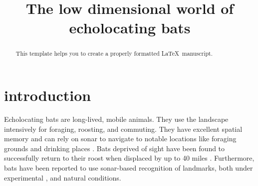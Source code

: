 \documentclass[preprint,5p]{elsarticle}
\begin{document}
\begin{frontmatter}

\title{The low dimensional world of echolocating bats}






\begin{abstract}
This template helps you to create a properly formatted \LaTeX\ manuscript.
\end{abstract}


\end{frontmatter}


\section{introduction}

Echolocating bats are long-lived, mobile animals. They use the landscape intensively for foraging, roosting, and commuting. They have excellent spatial memory \citep{Barchi2013,VonHelversen2005} and can rely on sonar to navigate to notable locations like foraging grounds and drinking places \citep[see][for references]{Vanderelst2016,Vanderelst2017}. Bats deprived of sight have been found to successfully return to their roost when displaced by up to 40 miles \citep{Stones1969,Williams1966,Davis1970,Mueller1957}. Furthermore, bats have been reported to use sonar-based recognition of landmarks, both under experimental \citep{Jensen2005,Yu2019}, and natural \citep{Verboom1999} conditions. 
\end{document}
